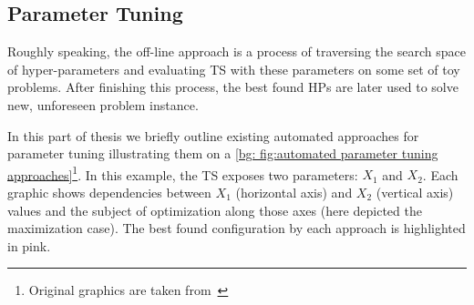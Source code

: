 
\subsection{Parameter Tuning}\label{bg: parameter tuning}
Roughly speaking, the off-line approach is a process of traversing the search space of hyper-parameters and evaluating TS with these parameters on some set of toy problems. After finishing this process, the best found HPs are later used to solve new, unforeseen problem instance.

In this part of thesis we briefly outline existing automated approaches for parameter tuning illustrating them on a \cref{bg: fig:automated parameter tuning approaches}\footnote{Original graphics are taken from~\cite{koch2017automated}}. In this example, the TS exposes two parameters: $X_1$ and $X_2$. Each graphic shows dependencies between $X_1$ (horizontal axis) and $X_2$ (vertical axis) values and the subject of optimization along those axes (here depicted the maximization case). The best found configuration by each approach is highlighted in pink.

